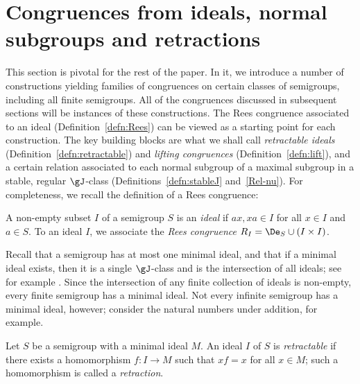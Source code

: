 \section{Congruences from ideals, normal subgroups and retractions}\label{sec-fam}


This section is pivotal for the rest of the paper.  In it, we introduce a number of constructions yielding families of congruences on certain classes of semigroups, including all finite semigroups.  
%
All of the congruences discussed in subsequent sections will be instances of these constructions.  The Rees congruence associated to an ideal (Definition~\ref{defn:Rees}) can be viewed as a starting point for each construction.  The key building blocks are what we shall call \emph{retractable ideals} (Definition~\ref{defn:retractable}) and \emph{lifting congruences} (Definition~\ref{defn:lift}), and a certain relation associated to each normal subgroup of a maximal subgroup in a stable, regular $\gJ$-class (Definitions~\ref{defn:stableJ} and~\ref{Rel-nu}).  
%
%
For completeness, we recall the definition of a Rees congruence:

\begin{definition}\label{defn:Rees}
A non-empty subset $I$ of a semigroup $S$ is an \emph{ideal} if $ax,xa\in I$ for all $x\in I$ and $a\in S$.  To an ideal $I$, we associate the \emph{Rees congruence} $R_I=\De_S\cup(I\times I)$.
\end{definition}

Recall that a semigroup has at most one minimal ideal, and that if a minimal ideal exists, then it is a single $\gJ$-class and is the intersection of all ideals; see for example \cite[Section 3.1]{Howie}.  Since the intersection of any finite collection of ideals is non-empty, every finite semigroup has a minimal ideal.  Not every infinite semigroup has a minimal ideal, however; consider the natural numbers under addition, for example.

\begin{definition}\label{defn:retractable}
  Let $S$ be a semigroup with a minimal ideal $M$.  An ideal $I$ of $S$ is \textit{retractable} if there exists a
  homomorphism $f: I \to M$ such that $xf = x$ for all $x\in M$; such a
  homomorphism is called a \textit{retraction}. 
\end{definition}

